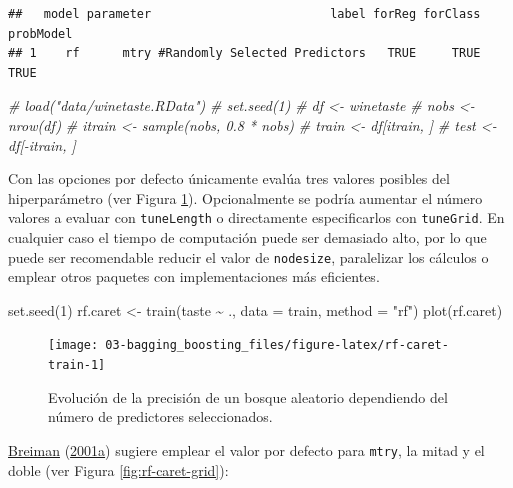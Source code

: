 \documentclass[
  spanish,
]{book}
\newenvironment{Shaded}{\begin{snugshade}}{\end{snugshade}}
\newcommand{\AttributeTok}[1]{\textcolor[rgb]{0.77,0.63,0.00}{#1}}
\newcommand{\CommentTok}[1]{\textcolor[rgb]{0.56,0.35,0.01}{\textit{#1}}}
\newcommand{\DecValTok}[1]{\textcolor[rgb]{0.00,0.00,0.81}{#1}}
\newcommand{\FunctionTok}[1]{\textcolor[rgb]{0.00,0.00,0.00}{#1}}
\newcommand{\NormalTok}[1]{#1}
\newcommand{\OtherTok}[1]{\textcolor[rgb]{0.56,0.35,0.01}{#1}}
\newcommand{\SpecialCharTok}[1]{\textcolor[rgb]{0.00,0.00,0.00}{#1}}
\newcommand{\StringTok}[1]{\textcolor[rgb]{0.31,0.60,0.02}{#1}}
\theoremstyle{break}
\theoremstyle{definition}
\theoremstyle{definition}
\theoremstyle{definition}
\theoremstyle{definition}
\theoremstyle{remark}
\begin{document}
\begin{verbatim}
##   model parameter                         label forReg forClass probModel
## 1    rf      mtry #Randomly Selected Predictors   TRUE     TRUE      TRUE
\end{verbatim}

\begin{Shaded}
\begin{Highlighting}[]
\CommentTok{\# load("data/winetaste.RData")}
\CommentTok{\# set.seed(1)}
\CommentTok{\# df \textless{}{-} winetaste}
\CommentTok{\# nobs \textless{}{-} nrow(df)}
\CommentTok{\# itrain \textless{}{-} sample(nobs, 0.8 * nobs)}
\CommentTok{\# train \textless{}{-} df[itrain, ]}
\CommentTok{\# test \textless{}{-} df[{-}itrain, ]}
\end{Highlighting}
\end{Shaded}

Con las opciones por defecto únicamente evalúa tres valores posibles del hiperparámetro (ver Figura \ref{fig:rf-caret-train}).
Opcionalmente se podría aumentar el número valores a evaluar con \texttt{tuneLength} o directamente especificarlos con \texttt{tuneGrid}.
En cualquier caso el tiempo de computación puede ser demasiado alto, por lo que puede ser recomendable reducir el valor de \texttt{nodesize}, paralelizar los cálculos o emplear otros paquetes con implementaciones más eficientes.

\begin{Shaded}
\begin{Highlighting}[]
\FunctionTok{set.seed}\NormalTok{(}\DecValTok{1}\NormalTok{)}
\NormalTok{rf.caret }\OtherTok{\textless{}{-}} \FunctionTok{train}\NormalTok{(taste }\SpecialCharTok{\textasciitilde{}}\NormalTok{ ., }\AttributeTok{data =}\NormalTok{ train, }\AttributeTok{method =} \StringTok{"rf"}\NormalTok{)}
\FunctionTok{plot}\NormalTok{(rf.caret)}
\end{Highlighting}
\end{Shaded}

\begin{figure}[!htb]

{\centering \texttt{[image: 03-bagging\_boosting\_files/figure-latex/rf-caret-train-1]} 

}

\caption{Evolución de la precisión de un bosque aleatorio dependiendo del número de predictores seleccionados.}\label{fig:rf-caret-train}
\end{figure}

\protect\hyperlink{ref-breiman2001random}{Breiman} (\protect\hyperlink{ref-breiman2001random}{2001a}) sugiere emplear el valor por defecto para \texttt{mtry}, la mitad y el doble (ver Figura \ref{fig:rf-caret-grid}):
\end{document}
